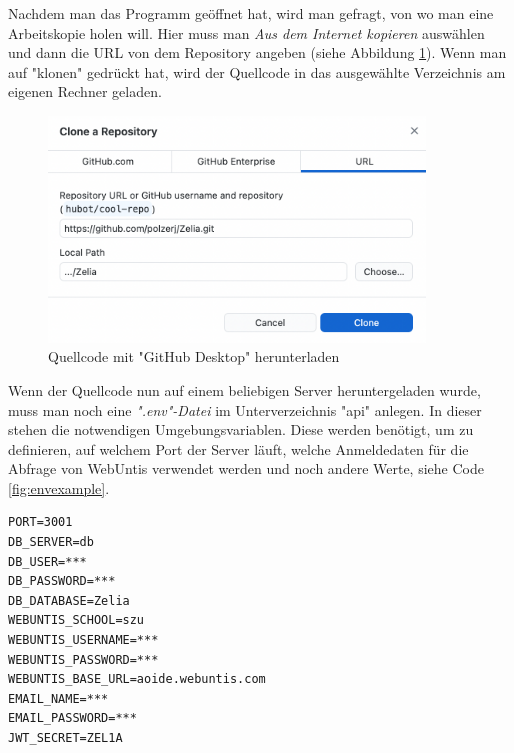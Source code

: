 \begin{minipage}{\textwidth}
    
    Nachdem man das Programm geöffnet hat, wird man gefragt, von wo man eine Arbeitskopie holen will. Hier muss man \emph{Aus dem Internet kopieren} auswählen und dann die URL von dem Repository angeben (siehe Abbildung \ref{fig:clonewithdesktop}). Wenn man auf "klonen" gedrückt hat, wird der Quellcode in das ausgewählte Verzeichnis am eigenen Rechner geladen. 
    
    \begin{figure}[H]
        \centering
        \includegraphics[width=100mm]{media/Handbuch/clone_gh.png}
        \caption{Quellcode mit "GitHub Desktop" herunterladen}
        \label{fig:clonewithdesktop}
    \end{figure}
\end{minipage}



Wenn der Quellcode nun auf einem beliebigen Server heruntergeladen wurde, muss man noch eine \emph{".env"-Datei} im Unterverzeichnis "api" anlegen. In dieser stehen die notwendigen Umgebungsvariablen. Diese werden benötigt, um zu definieren, auf welchem Port der Server läuft, welche Anmeldedaten für die Abfrage von WebUntis verwendet werden und noch andere Werte, siehe Code \ref{fig:envexample}.


\begin{singlespace}
    \begin{lstlisting}[caption={Beispiel einer ".env"-Datei},label={fig:envexample},captionpos=b]
PORT=3001
DB_SERVER=db
DB_USER=***
DB_PASSWORD=***
DB_DATABASE=Zelia
WEBUNTIS_SCHOOL=szu
WEBUNTIS_USERNAME=***
WEBUNTIS_PASSWORD=***
WEBUNTIS_BASE_URL=aoide.webuntis.com
EMAIL_NAME=***
EMAIL_PASSWORD=***
JWT_SECRET=ZEL1A
    \end{lstlisting}
\end{singlespace}

